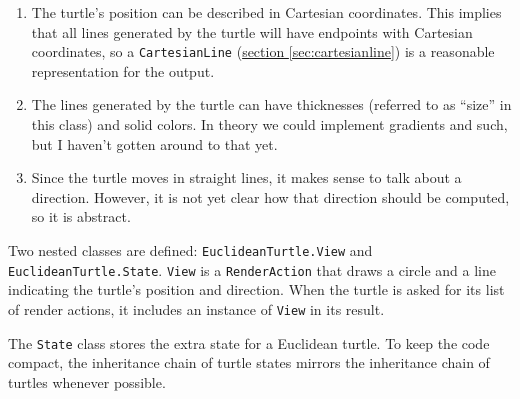 \documentclass{report}
\newcommand{\Ref}[2]{\hyperref[#2]{#1 \ref*{#2}}}
\begin{document}
\begin{enumerate}
\item The turtle's position can be described in Cartesian coordinates. This implies that all lines generated by the turtle will have endpoints with
          Cartesian coordinates, so a {\tt CartesianLine} (\Ref{section}{sec:cartesianline}) is a reasonable representation for the output.
\item The lines generated by the turtle can have thicknesses (referred to as ``size'' in this class) and solid colors. In theory we could implement
          gradients and such, but I haven't gotten around to that yet.
\item Since the turtle moves in straight lines, it makes sense to talk about a direction. However, it is not yet clear how that direction should be
          computed, so it is abstract.
\end{enumerate}

      Two nested classes are defined: \verb|EuclideanTurtle.View| and \verb|EuclideanTurtle.State|. {\tt View} is a {\tt RenderAction} that draws a circle and a
      line indicating the turtle's position and direction. When the turtle is asked for its list of render actions, it includes an instance of {\tt View} in its
      result.

      The {\tt State} class stores the extra state for a Euclidean turtle. To keep the code compact, the inheritance chain of turtle states mirrors the
      inheritance chain of turtles whenever possible.
\end{document}

